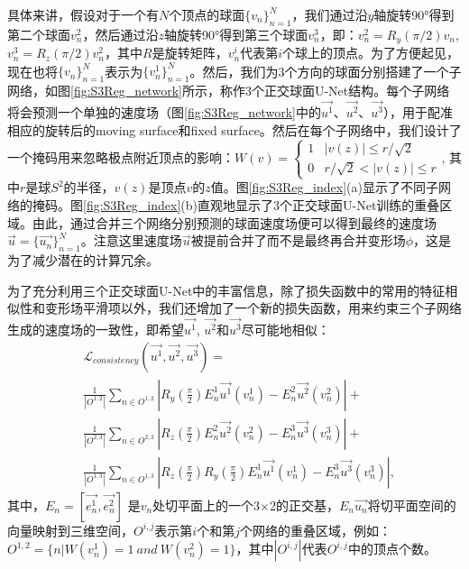 具体来讲，假设对于一个有$N$个顶点的球面${\{v_n\}}_{n=1}^N$，我们通过沿$y$轴旋转\ang{90}得到第二个球面${v_n^2}$，然后通过沿$z$轴旋转\ang{90}得到第三个球面${v_n^3}$，即：$v_n^2=R_y(\pi/2)v_n$, $v_n^3=R_z(\pi/2)v_n^2$，其中$R$是旋转矩阵，${v_n^i}$代表第$i$个球上的顶点。为了方便起见，现在也将${\{v_n\}}_{n=1}^N$表示为${\{v_n^1\}}_{n=1}^N$。然后，我们为3个方向的球面分别搭建了一个子网络，如图\ref{fig:S3Reg_network}所示，称作3个正交球面U-Net结构。每个子网络将会预测一个单独的速度场（图\ref{fig:S3Reg_network}中的$\overrightarrow{u^1}$、$\overrightarrow{u^2}$、$\overrightarrow{u^3}$），用于配准相应的旋转后的moving surface和fixed surface。然后在每个子网络中，我们设计了一个掩码用来忽略极点附近顶点的影响：$
	W(v)=\begin{cases} 
	1 & |v(z)| \leq r/\sqrt{2} \\
	0 & r/\sqrt{2} < |v(z)| \leq r  
	\end{cases}
$, 其中$r$是球$S^2$的半径，$v(z)$是顶点$v$的$z$值。图\ref{fig:S3Reg_index}(a)显示了不同子网络的掩码。图\ref{fig:S3Reg_index}(b)直观地显示了3个正交球面U-Net训练的重叠区域。由此，通过合并三个网络分别预测的球面速度场便可以得到最终的速度场$\overrightarrow{u}=\{\overrightarrow{u_n}\}_{n=1}^N$。注意这里速度场$\overrightarrow{u}$被提前合并了而不是最终再合并变形场$\phi$，这是为了减少潜在的计算冗余。

为了充分利用三个正交球面U-Net中的丰富信息，除了损失函数中的常用的特征相似性和变形场平滑项以外，我们还增加了一个新的损失函数，用来约束三个子网络生成的速度场的一致性，即希望$\overrightarrow{u^1}$, $\overrightarrow{u^2}$和$\overrightarrow{u^3}$尽可能地相似：
\begin{equation}
\begin{split}
&{\mathcal{L}}_{consistency}({\overrightarrow{u^1}},{\overrightarrow{u^2}},{\overrightarrow{u^3}}) = \\
& \frac{1}{{\left| {{O^{1,2}}} \right|}}\sum\nolimits_{n \in {O^{1,2}}} {\left| {{R_y}(\frac{\pi }{2})E_n^1{\overrightarrow{u^1}}(v_n^1) - E_n^2{\overrightarrow{u^2}}(v_n^2)} \right| + } \\
&\frac{1}{{\left| {{O^{2,3}}} \right|}}\sum\nolimits_{n \in {O^{2,3}}} {\left| {{R_z}(\frac{\pi }{2})E_n^2{\overrightarrow{u^2}}(v_n^2) - E_n^3{\overrightarrow{u^3}}(v_n^3)} \right| + } \\
&\frac{1}{{\left| {{O^{1,3}}} \right|}}\sum\nolimits_{n \in {O^{1,3}}} {\left| {{R_z}(\frac{\pi }{2}){R_y}(\frac{\pi }{2})E_n^1{\overrightarrow{u^1}}(v_n^1) - E_n^3{\overrightarrow{u^3}}(v_n^3)} \right|},
\end{split}
\end{equation}
其中，$E_n=[\overrightarrow{e_n^1}, \overrightarrow{e_n^2}]$ 是$v_n$处切平面上的一个3$\times$2的正交基，$E_n\overrightarrow{u_n}$将切平面空间的向量映射到三维空间，$O^{i,j}$表示第$i$个和第$j$个网络的重叠区域，例如：$O^{1,2}=\{n|W(v_n^1)=1 \: and \: W(v_n^2)=1\}$，其中$|O^{i,j}|$代表$O^{i,j}$中的顶点个数。


